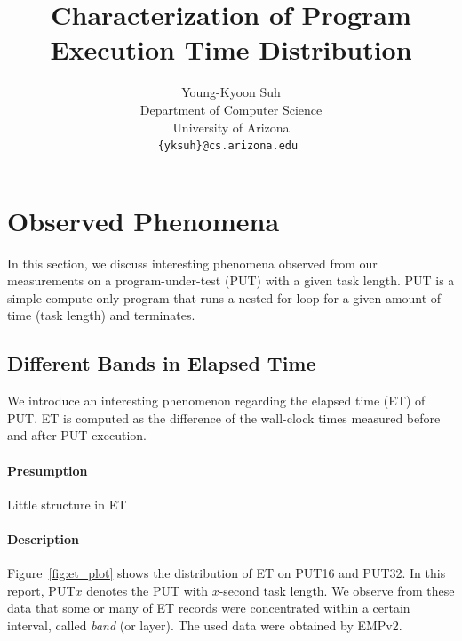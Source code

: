 \documentclass[10pt]{article}
\begin{document}
\title{Characterization of Program Execution Time Distribution}

\author{
Young-Kyoon Suh\\
Department of Computer Science \\
University of Arizona \\
\small\tt \{yksuh\}@cs.arizona.edu
}
\maketitle

\section{Observed Phenomena}
In this section, we discuss interesting phenomena observed from our measurements on 
a program-under-test (PUT) with a given task length. 
PUT is a simple compute-only program that runs a nested-for loop for a given amount of time (task length) and terminates.


\subsection{Different Bands in Elapsed Time}
\label{sec:bands}

We introduce an interesting phenomenon regarding the elapsed time (ET) of PUT.
ET is computed as the difference of the wall-clock times measured before and after PUT execution.

\paragraph{Presumption} Little structure in ET

\paragraph{Description} Figure~\ref{fig:et_plot} shows the distribution of ET on PUT16 and PUT32. 
In this report, PUT$x$ denotes the PUT with $x$-second task length.
We observe from these data that some or many of ET records were concentrated within a certain interval, 
called {\em band} (or layer). The used data were obtained by EMPv2.
\end{document}
